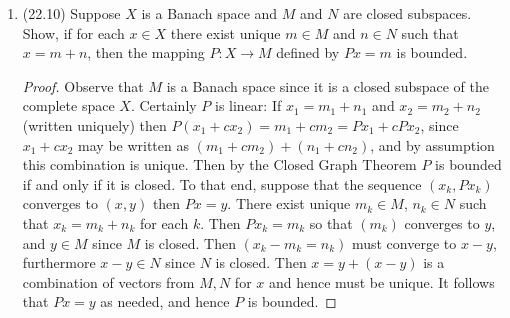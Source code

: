\documentclass[11pt]{article}
\newcommand{\cbr}[1]{\left\{#1\right\}}
\begin{document}
\begin{enumerate}
\begin{proof}
      Furthermore, note that $X_n$ is contained as a subspace of $X_{n+1}$ for each $n$, and so the countable union $\cup_{i = 1}^\infty X_i$ is given by the span of the basis $\cbr{x_i}_{i=1}^\infty$; that is, the union is exactly $X$. So $X$ may be written as the countable union of nowhere dense sets $X_n$, but since $X$ is complete we arrive at a contradiction as $X$ is a Baire space (which cannot be given as the countable union of nowhere dense sets). Hence there is no norm on which $X$ is complete in. 
    \end{proof}
    \item (22.10) Suppose $X$ is a Banach space and $M$ and $N$ are closed subspaces. Show, if for each $x \in X$ there exist unique $m\in M$ and $n\in N$ such that $x = m + n$, then the mapping $P : X \to M$ defined by $Px = m$ is bounded. \begin{proof}
      Observe that $M$ is a Banach space since it is a closed subspace of the complete space $X$. Certainly $P$ is linear: If $x_1 = m_1+n_1$ and $x_2 = m_2 + n_2$ (written uniquely) then $P(x_1 + cx_2) = m_1 + cm_2 = Px_1 + cPx_2$, since $x_1 + cx_2$ may be written as $(m_1 + cm_2) + (n_1 + cn_2)$, and by assumption this combination is unique. Then by the Closed Graph Theorem $P$ is bounded if and only if it is closed. To that end, suppose that the sequence $(x_k,Px_k)$ converges to $(x,y)$ then $Px = y$. There exist unique $m_k\in M$, $n_k\in N$ such that $x_k = m_k +n_k$ for each $k$. Then $Px_k = m_k$ so that $(m_k)$ converges to $y$, and $y\in M$ since $M$ is closed. Then $(x_k-m_k = n_k)$ must converge to $x-y$, furthermore $x-y\in N$ since $N$ is closed. Then $x = y + (x-y)$ is a combination of vectors from $M,N$ for $x$ and hence must be unique. It follows that $Px = y$ as needed, and hence $P$ is bounded.
    \end{proof}
\end{enumerate}
\end{document}
